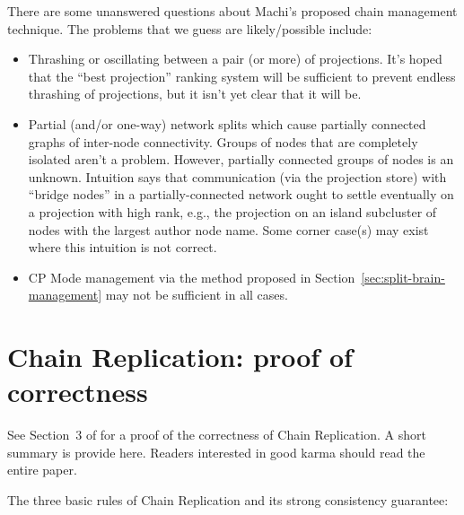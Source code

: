 \documentclass[preprint,10pt]{sigplanconf}
\begin{document}
There are some unanswered questions about Machi's proposed chain
management technique.  The problems that we guess are likely/possible
include:

\begin{itemize}

\item Thrashing or oscillating between a pair (or more) of
  projections.  It's hoped that the ``best projection'' ranking system
  will be sufficient to prevent endless thrashing of projections, but
  it isn't yet clear that it will be.

\item Partial (and/or one-way) network splits which cause partially
  connected graphs of inter-node connectivity.  Groups of nodes that
  are completely isolated aren't a problem.  However, partially
  connected groups of nodes is an unknown.  Intuition says that
  communication (via the projection store) with ``bridge nodes'' in a
  partially-connected network ought to settle eventually on a
  projection with high rank, e.g., the projection on an island
  subcluster of nodes with the largest author node name.  Some corner
  case(s) may exist where this intuition is not correct.

\item CP Mode management via the method proposed in
  Section~\ref{sec:split-brain-management} may not be sufficient in
  all cases.

\end{itemize}

\section{Chain Replication: proof of correctness}
\label{sub:cr-proof}

See Section~3 of \cite{chain-replication} for a proof of the
correctness of Chain Replication.  A short summary is provide here.
Readers interested in good karma should read the entire paper.

The three basic rules of Chain Replication and its strong
consistency guarantee:
\end{document}
